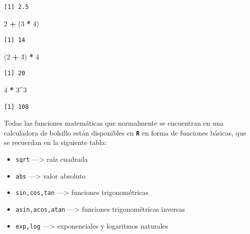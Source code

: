 \documentclass[
]{article}
\newenvironment{Shaded}{\begin{snugshade}}{\end{snugshade}}
\newcommand{\DecValTok}[1]{\textcolor[rgb]{0.00,0.00,0.81}{#1}}
\newcommand{\NormalTok}[1]{#1}
\newcommand{\SpecialCharTok}[1]{\textcolor[rgb]{0.81,0.36,0.00}{\textbf{#1}}}
\begin{document}
\begin{verbatim}
[1] 2.5
\end{verbatim}

\begin{Shaded}
\begin{Highlighting}[]
\DecValTok{2} \SpecialCharTok{+}\NormalTok{ (}\DecValTok{3} \SpecialCharTok{*} \DecValTok{4}\NormalTok{)}
\end{Highlighting}
\end{Shaded}

\begin{verbatim}
[1] 14
\end{verbatim}

\begin{Shaded}
\begin{Highlighting}[]
\NormalTok{(}\DecValTok{2} \SpecialCharTok{+} \DecValTok{3}\NormalTok{) }\SpecialCharTok{*} \DecValTok{4}
\end{Highlighting}
\end{Shaded}

\begin{verbatim}
[1] 20
\end{verbatim}

\begin{Shaded}
\begin{Highlighting}[]
\DecValTok{4} \SpecialCharTok{*} \DecValTok{3}\SpecialCharTok{\^{}}\DecValTok{3}
\end{Highlighting}
\end{Shaded}

\begin{verbatim}
[1] 108
\end{verbatim}

Todas las funciones matemáticas que normalmente se encuentran en una calculadora de bolsillo están disponibles en \textbf{\texttt{R}} en forma de funciones básicas, que se recuerdan en la siguiente tabla:

\begin{itemize}
\item
  \texttt{sqrt} ---\textgreater{} raíz cuadrada
\item
  \texttt{abs} ---\textgreater{} valor absoluto
\item
  \texttt{sin,cos,tan} ---\textgreater{} funciones trigonométricas
\item
  \texttt{asin,acos,atan} ---\textgreater{} funciones trigonométricas inversas
\item
  \texttt{exp,log} ---\textgreater{} exponenciales y logaritmos naturales
\end{itemize}
\end{document}
